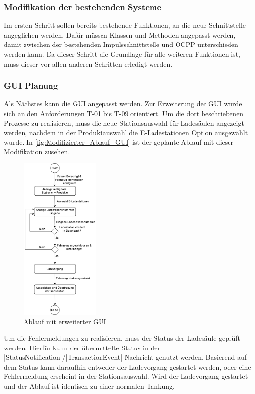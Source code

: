 \subsubsection{Modifikation der bestehenden Systeme}
Im ersten Schritt sollen bereits bestehende Funktionen, an die neue Schnittstelle angeglichen werden. Dafür müssen Klassen und Methoden angepasst werden, damit zwischen der bestehenden Impulsschnittstelle und OCPP unterschieden werden kann. Da dieser Schritt die Grundlage für alle weiteren Funktionen ist, muss dieser vor allen anderen Schritten erledigt werden.
\subsubsection{GUI Planung}
Als Nächstes kann die GUI angepasst werden. 
Zur Erweiterung der GUI wurde sich an den Anforderungen T-01 bis T-09 orientiert. Um die dort beschriebenen Prozesse zu realisieren, muss die neue Stationsauswahl für Ladesäulen angezeigt werden, nachdem in der Produktauswahl die \glqq{}E-Ladestationen\grqq{} Option ausgewählt wurde. In \autoref{fig:Modifizierter_Ablauf_GUI} ist der geplante Ablauf mit dieser Modifikation zusehen.
\begin{figure}[H]
	\centering
	\includegraphics[width=0.35\textwidth]{images/Architektur/Ablauf_Ladevorgang(1).png}
	\caption{Ablauf mit erweiterter GUI \cite{Eigene_Darstellung}}
	\label{fig:Modifizierter_Ablauf_GUI}
\end{figure}

\noindent Um die Fehlermeldungen zu realisieren, muss der Status der Ladesäule geprüft werden. Hierfür kann der übermittelte Status in der \spverb|StatusNotification|/\spverb|TransactionEvent| Nachricht genutzt werden. Basierend auf dem Status kann daraufhin entweder der Ladevorgang gestartet werden, oder eine Fehlermeldung erscheint in der Stationsauswahl. Wird der Ladevorgang gestartet und der Ablauf ist identisch zu einer normalen Tankung. \\

